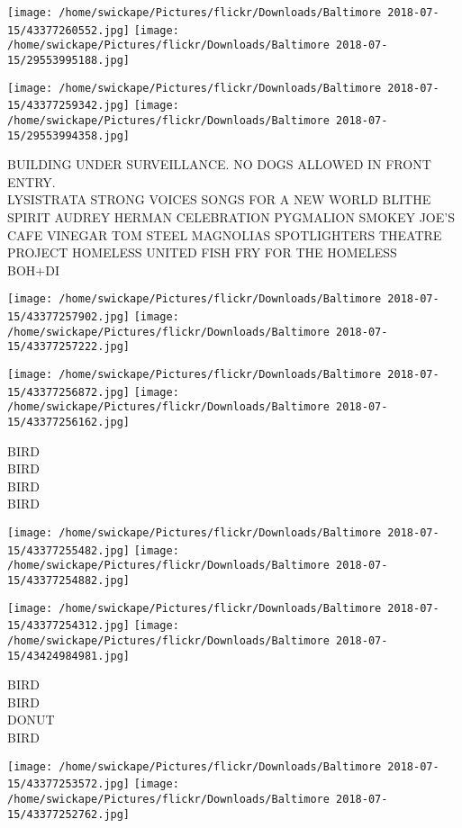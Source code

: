 \documentclass[10pt,letterpaper]{article}
\begin{document}
\texttt{[image: /home/swickape/Pictures/flickr/Downloads/Baltimore 2018-07-15/43377260552.jpg]}
\texttt{[image: /home/swickape/Pictures/flickr/Downloads/Baltimore 2018-07-15/29553995188.jpg]}

\texttt{[image: /home/swickape/Pictures/flickr/Downloads/Baltimore 2018-07-15/43377259342.jpg]}
\texttt{[image: /home/swickape/Pictures/flickr/Downloads/Baltimore 2018-07-15/29553994358.jpg]}

BUILDING UNDER SURVEILLANCE.  NO DOGS ALLOWED IN FRONT ENTRY.\\
LYSISTRATA STRONG VOICES SONGS FOR A NEW WORLD BLITHE SPIRIT AUDREY HERMAN CELEBRATION PYGMALION SMOKEY JOE'S CAFE VINEGAR TOM STEEL MAGNOLIAS SPOTLIGHTERS THEATRE\\
PROJECT HOMELESS UNITED FISH FRY FOR THE HOMELESS\\
BOH+DI
\pagebreak

\texttt{[image: /home/swickape/Pictures/flickr/Downloads/Baltimore 2018-07-15/43377257902.jpg]}
\texttt{[image: /home/swickape/Pictures/flickr/Downloads/Baltimore 2018-07-15/43377257222.jpg]}

\texttt{[image: /home/swickape/Pictures/flickr/Downloads/Baltimore 2018-07-15/43377256872.jpg]}
\texttt{[image: /home/swickape/Pictures/flickr/Downloads/Baltimore 2018-07-15/43377256162.jpg]}

BIRD\\
BIRD\\
BIRD\\
BIRD
\pagebreak

\texttt{[image: /home/swickape/Pictures/flickr/Downloads/Baltimore 2018-07-15/43377255482.jpg]}
\texttt{[image: /home/swickape/Pictures/flickr/Downloads/Baltimore 2018-07-15/43377254882.jpg]}

\texttt{[image: /home/swickape/Pictures/flickr/Downloads/Baltimore 2018-07-15/43377254312.jpg]}
\texttt{[image: /home/swickape/Pictures/flickr/Downloads/Baltimore 2018-07-15/43424984981.jpg]}

BIRD\\
BIRD\\
DONUT\\
BIRD
\pagebreak

\texttt{[image: /home/swickape/Pictures/flickr/Downloads/Baltimore 2018-07-15/43377253572.jpg]}
\texttt{[image: /home/swickape/Pictures/flickr/Downloads/Baltimore 2018-07-15/43377252762.jpg]}
\end{document}
